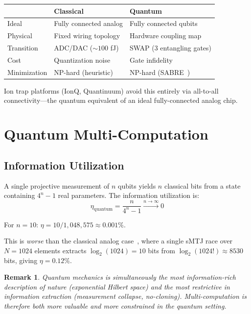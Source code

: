 \documentclass[11pt]{article}
\newtheorem{remark}{Remark}
\begin{document}
\begin{center}
\begin{tabular}{lll}
\toprule
& Classical & Quantum \\
\midrule
Ideal & Fully connected analog & Fully connected qubits \\
Physical & Fixed wiring topology & Hardware coupling map \\
Transition & ADC/DAC (${\sim}100$ fJ) & SWAP (3 entangling gates) \\
Cost & Quantization noise & Gate infidelity \\
Minimization & NP-hard (heuristic) & NP-hard (SABRE~\cite{sabre}) \\
\bottomrule
\end{tabular}
\end{center}

Ion trap platforms (IonQ, Quantinuum) avoid this entirely via all-to-all connectivity---the quantum equivalent of an ideal fully-connected analog chip.

\section{Quantum Multi-Computation}
\label{sec:multicomp}

\subsection{Information Utilization}

A single projective measurement of $n$ qubits yields $n$ classical bits from a state containing $4^n - 1$ real parameters. The information utilization is:
\begin{equation}
\eta_{\text{quantum}} = \frac{n}{4^n - 1} \xrightarrow{n \to \infty} 0
\end{equation}

For $n = 10$: $\eta = 10 / 1{,}048{,}575 \approx 0.001\%$.

This is \textit{worse} than the classical analog case~\cite{bieg_multi}, where a single sMTJ race over $N = 1024$ elements extracts $\log_2(1024) = 10$ bits from $\log_2(1024!) \approx 8530$ bits, giving $\eta = 0.12\%$.

\begin{remark}
Quantum mechanics is simultaneously the most information-rich description of nature (exponential Hilbert space) and the most restrictive in information extraction (measurement collapse, no-cloning). Multi-computation is therefore both more valuable and more constrained in the quantum setting.
\end{remark}
\end{document}
